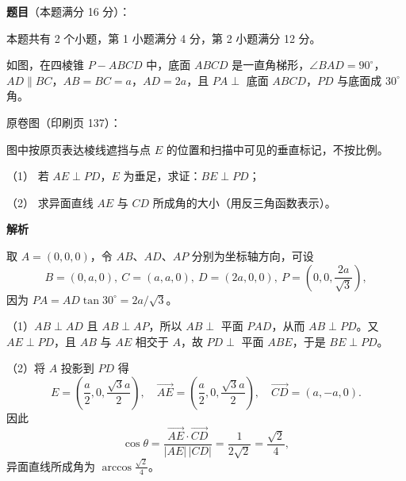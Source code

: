 \begin{answer}

\textbf{题目}（本题满分 16 分）：

本题共有 2 个小题，第 1 小题满分 4 分，第 2 小题满分 12 分。

如图，在四棱锥 $P-ABCD$ 中，底面 $ABCD$ 是一直角梯形，$\angle BAD=90^\circ$，$AD\parallel BC$，$AB=BC=a$，$AD=2a$，且 $PA\perp$ 底面 $ABCD$，$PD$ 与底面成 $30^\circ$ 角。

原卷图（印刷页 137）：
\nopagebreak[4]
\begin{center}\end{center}
\nopagebreak[4]
图中按原页表达棱线遮挡与点 $E$ 的位置和扫描中可见的垂直标记，不按比例。

（1） 若 $AE\perp PD$，$E$ 为垂足，求证：$BE\perp PD$；

（2） 求异面直线 $AE$ 与 $CD$ 所成角的大小（用反三角函数表示）。

\textbf{解析}

取 $A=(0,0,0)$，令 $AB$、$AD$、$AP$ 分别为坐标轴方向，可设
\nopagebreak[4]
\[
B=(0,a,0),\ C=(a,a,0),\ D=(2a,0,0),\ P=\left(0,0,\frac{2a}{\sqrt3}\right),
\]
因为 $PA=AD\tan30^\circ=2a/\sqrt3$。


（1）$AB\perp AD$ 且 $AB\perp AP$，所以 $AB\perp$ 平面 $PAD$，从而 $AB\perp PD$。又 $AE\perp PD$，且 $AB$ 与 $AE$ 相交于 $A$，故 $PD\perp$ 平面 $ABE$，于是 $BE\perp PD$。


（2）将 $A$ 投影到 $PD$ 得
\nopagebreak[4]
\[
E=\left(\frac a2,0,\frac{\sqrt3a}{2}\right),\quad
\overrightarrow{AE}=\left(\frac a2,0,\frac{\sqrt3a}{2}\right),\quad
\overrightarrow{CD}=(a,-a,0).
\]
因此
\nopagebreak[4]
\[
\cos\theta=\frac{\overrightarrow{AE}\cdot\overrightarrow{CD}}
{|AE|\,|CD|}=\frac{1}{2\sqrt2}=\frac{\sqrt2}{4},
\]
异面直线所成角为 $\arccos\frac{\sqrt2}{4}$。



\end{answer}
